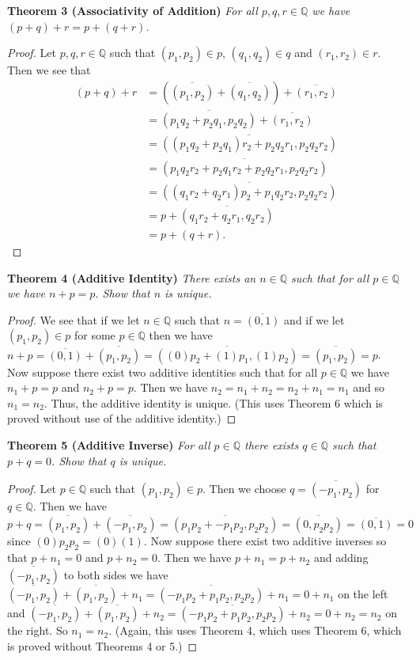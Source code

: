 \documentclass{article}
\begin{document}
\begin{flushleft}
\textbf{Theorem 3 (Associativity of Addition)}
\textsl{For all $p,q,r \in \mathbb{Q}$ we have $(p+q)+r = p+(q+r)$.}
\begin{proof}
Let $p,q,r \in \mathbb{Q}$ such that $(p_1,p_2) \in p$, $(q_1,q_2) \in q$ and $(r_1,r_2) \in r$. Then we see that
\begin{align*}
(p+q)+r&=\left(\overline{(p_1,p_2)}+\overline{(q_1,q_2)}\right)+\overline{(r_1,r_2)} \\
		&=\overline{(p_1q_2+p_2q_1,p_2q_2)}+\overline{(r_1,r_2)} \\
		&=\overline{((p_1q_2+p_2q_1)r_2+p_2q_2r_1,p_2q_2r_2)} \\
		&=\overline{(p_1q_2r_2+p_2q_1r_2+p_2q_2r_1,p_2q_2r_2)} \\
		&=\overline{((q_1r_2+q_2r_1)p_2+p_1q_2r_2,p_2q_2r_2)} \\
		&=p+\overline{(q_1r_2+q_2r_1,q_2r_2)} \\
		&=p+(q+r).
\end{align*}
\end{proof}

\textbf{Theorem 4 (Additive Identity)}
\textsl{There exists an $n \in \mathbb{Q}$ such that for all $p \in \mathbb{Q}$ we have $n+p=p$. Show that $n$ is unique.}
\begin{proof}
We see that if we let $n \in \mathbb{Q}$ such that $n = \overline{(0,1)}$ and if we let $(p_1,p_2) \in p$ for some $p \in \mathbb{Q}$ then we have $n+p=\overline{(0,1)}+\overline{(p_1,p_2)}=\overline{((0)p_2+(1)p_1,(1)p_2)}=\overline{(p_1,p_2)}=p$. Now suppose there exist two additive identities such that for all $p \in \mathbb{Q}$ we have $n_1+p=p$ and $n_2+p=p$. Then we have $n_2=n_1+n_2 = n_2+n_1=n_1$ and so $n_1=n_2$. Thus, the additive identity is unique. (This uses Theorem 6 which is proved without use of the additive identity.)
\end{proof}

\textbf{Theorem 5 (Additive Inverse)}
\textsl{For all $p \in \mathbb{Q}$ there exists $q \in \mathbb{Q}$ such that $p+q=0$. Show that $q$ is unique.}
\begin{proof}
Let $p \in \mathbb{Q}$ such that $(p_1,p_2) \in p$. Then we choose $q=\overline{(-p_1,p_2)}$ for $q \in \mathbb{Q}$. Then we have $p+q=\overline{(p_1,p_2)}+\overline{(-p_1,p_2)}=\overline{(p_1p_2+-p_1p_2,p_2p_2)}=\overline{(0,p_2p_2)}=\overline{(0,1)}=0$ since $(0)p_2p_2=(0)(1)$. Now suppose there exist two additive inverses so that $p+n_1=0$ and $p+n_2=0$. Then we have $p+n_1=p+n_2$ and adding $\overline{(-p_1,p_2)}$ to both sides we have $\overline{(-p_1,p_2)}+\overline{(p_1,p_2)}+n_1=\overline{(-p_1p_2+p_1p_2,p_2p_2)}+n_1=0+n_1$ on the left and $\overline{(-p_1,p_2)}+\overline{(p_1,p_2)}+n_2=\overline{(-p_1p_2+p_1p_2,p_2p_2)}+n_2=0+n_2=n_2$ on the right. So $n_1=n_2$. (Again, this uses Theorem 4, which uses Theorem 6, which is proved without Theorems 4 or 5.)
\end{proof}


\end{flushleft}
\end{document}
